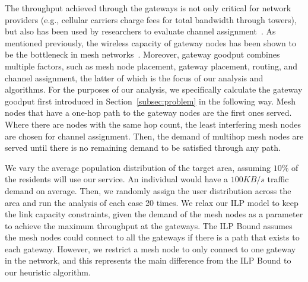 

The throughput achieved through the gateways is not only critical for network providers (e.g., cellular
carriers charge fees for total bandwidth through towers), but also has been used by researchers
to evaluate channel assignment~\cite{avallone2008channel}.  As mentioned previously, the wireless
capacity of gateway nodes has been shown to be the bottleneck in mesh networks~\cite{robinson2010deploying}.
Moreover, gateway goodput combines multiple factors, such as mesh node placement, gateway placement, 
routing, and channel assignment, the latter of which is the focus of our analysis and algorithms. For the purposes of our analysis, we specifically calculate the gateway goodput first introduced 
in Section~\ref{subsec:problem} in the following way.  Mesh nodes that have a one-hop path to the gateway
nodes are the first ones served. Where there are nodes with the same hop count, the least interfering
mesh nodes are chosen for channel assignment. Then, the demand of multihop mesh nodes are served 
until there is no remaining demand to be satisfied through any path.

We vary the average population distribution of the target area, assuming $10\%$ of the residents will use
our service. An individual would have a $100 KB/s$ traffic demand on average. Then, we randomly assign
the user distribution across the area and run the analysis of each case 20 times.  
We relax our ILP model to keep the link capacity constraints, given the demand of the mesh nodes as a
parameter to achieve the maximum throughput at the gateways. The ILP Bound assumes the mesh 
nodes could connect to all the gateways if there is a path that exists to each gateway. However,
we restrict a mesh node to only connect to one gateway in the network, and this represents the
main difference from the ILP Bound to our heuristic algorithm.



